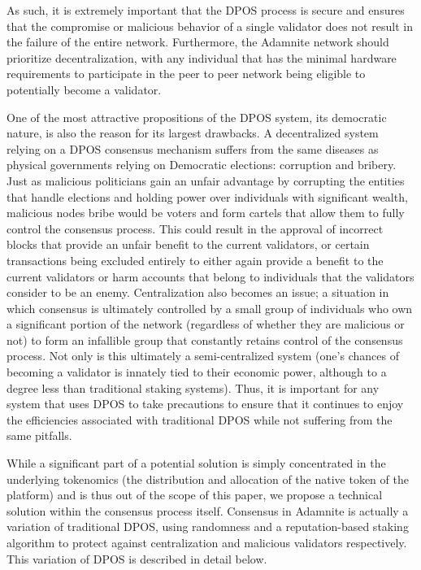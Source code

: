 \documentclass[conference]{IEEEtran}
\begin{document}
As such, it is extremely important that the DPOS process is secure and ensures that the compromise or malicious behavior of a single validator does not result in the failure of the entire network. Furthermore, the Adamnite network should prioritize decentralization, with any individual that has the minimal hardware requirements to participate in the peer to peer network being eligible to potentially become a validator.

One of the most attractive propositions of the DPOS system, its democratic nature, is also the reason for its largest drawbacks. A decentralized system relying on a DPOS consensus mechanism suffers from the same diseases as physical governments relying on Democratic elections: corruption and bribery. Just as malicious politicians gain an unfair advantage by corrupting the entities that handle elections and holding power over individuals with significant wealth, malicious nodes bribe would be voters and form cartels that allow them to fully control the consensus process. This could result in the approval of incorrect blocks that provide an unfair benefit to the current validators, or certain transactions being excluded entirely to either again provide a benefit to the current validators or harm accounts that belong to individuals that the validators consider to be an enemy. Centralization also becomes an issue; a situation in which consensus is ultimately controlled by a small group of individuals who own a significant portion of the network (regardless of whether they are malicious or not) to form an infallible group that constantly retains control of the consensus process. Not only is this ultimately a semi-centralized system (one's chances of becoming a validator is innately tied to their economic power, although to a degree less than traditional staking systems). Thus, it is important for any system that uses DPOS to take precautions to ensure that it continues to enjoy the efficiencies associated with traditional DPOS while not suffering from the same pitfalls.


While a significant part of a potential solution is simply concentrated in the underlying tokenomics (the distribution and allocation of the native token of the platform) and is thus out of the scope of this paper, we propose a technical solution within the consensus process itself. Consensus in Adamnite is actually a variation of traditional DPOS, using randomness and a reputation-based staking algorithm to protect against centralization and malicious validators respectively. This variation of DPOS is described in detail below.\\
\end{document}
